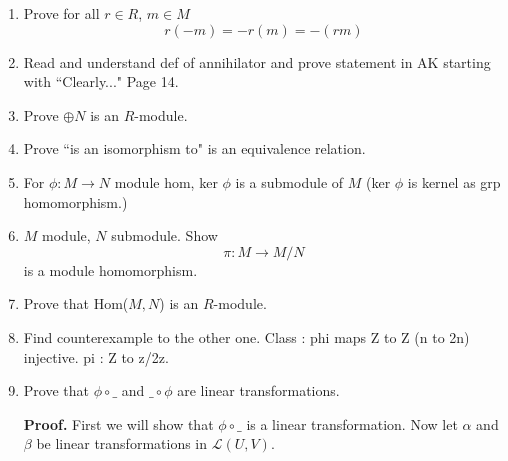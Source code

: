 \documentclass[9pt]{article}
\begin{document}
\begin{enumerate}
   \item Prove for all $r \in R$, $m \in M$
         $$r(-m) = -r(m) = -(rm)$$
   \item Read and understand def of annihilator and prove statement in AK
         starting with ``Clearly..." Page 14.
   \item Prove $ \oplus N$ is an $R$-module. 
   \item Prove ``is an isomorphism to" is an equivalence relation.
   \item For $\phi : M \rightarrow N$ module hom, ker $\phi$ is a submodule of
         $M$ (ker $\phi$ is kernel as grp homomorphism.)
   \item $M$ module, $N$ submodule. Show
         $$\pi : M \rightarrow M/N$$ is a module homomorphism.
   \item Prove that Hom($M, N$) is an $R$-module.
   \item Find counterexample to the other one. Class : phi maps Z to Z (n to 2n)
         injective. pi : Z to z/2z.
   \item Prove that $\phi \circ \_$ and $\_ \circ \phi$ are linear
         transformations.

      \textbf{Proof.} First we will show that $\phi \circ \_$ is a linear
      transformation. Now let $\alpha$ and $\beta$ be linear transformations in
      $\mathcal{L}(U, V)$.
      

\end{enumerate}
\end{document}
